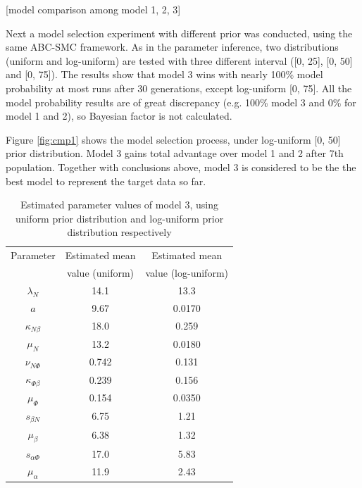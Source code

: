 [model comparison among model 1, 2, 3]

Next a model selection experiment with different prior was conducted, using the same ABC-SMC framework. As in the parameter inference, two distributions (uniform and log-uniform) are tested with three different interval ([0, 25], [0, 50] and [0, 75]). The results show that model 3 wins with nearly 100\% model probability at most runs after 30 generations, except log-uniform [0, 75]. All the model probability results are of great discrepancy (e.g. 100\% model 3 and 0\% for model 1 and 2), so Bayesian factor is not calculated.

Figure \ref{fig:cmp1} shows the model selection process, under log-uniform [0, 50] prior distribution. Model 3 gains total advantage over model 1 and 2 after 7th population. Together with conclusions above, model 3 is considered to be the the best model to represent the target data so far.



\begin{table}[t!]
    \centering
    \begin{tabular}{|c c c|}
        \hline
        Parameter            & Estimated mean  & Estimated mean      \\
                             & value (uniform) & value (log-uniform) \\[0.5ex]
        \hline\hline
        $\lambda_N$          & 14.1            & 13.3                \\
        $a$                  & 9.67            & 0.0170              \\
        $\kappa_{N\beta}$    & 18.0            & 0.259               \\
        $\mu_N$              & 13.2            & 0.0180              \\
        $\nu_{N\Phi}$        & 0.742           & 0.131               \\
        \hline
        $\kappa_{\Phi\beta}$ & 0.239           & 0.156               \\
        $\mu_\Phi$           & 0.154           & 0.0350              \\
        \hline
        $s_{\beta N}$        & 6.75            & 1.21                \\
        $\mu_\beta$          & 6.38            & 1.32                \\
        \hline
        $s_{\alpha\Phi}$     & 17.0            & 5.83                \\
        $\mu_\alpha$         & 11.9            & 2.43                \\
        \hline
    \end{tabular}
    \caption[Estimated parameter values of model 3]
    {Estimated parameter values of model 3, using uniform prior distribution and log-uniform prior distribution respectively}
    \label{table:estimated1}
\end{table}

